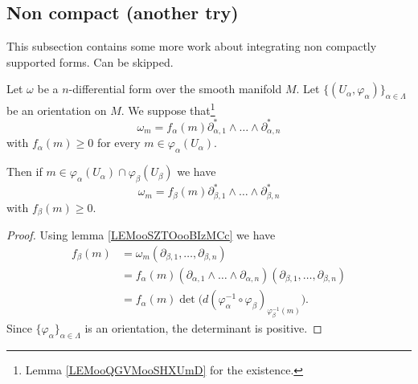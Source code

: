 

\subsection{Non compact (another try)}

This subsection contains some more work about integrating non compactly supported forms. Can be skipped.


\begin{lemma}	\label{LEMooEKYAooERjAnc}
	Let \( \omega\) be a \( n\)-differential form over the smooth manifold \( M\). Let \( \{ (U_{\alpha},\varphi_{\alpha}) \}_{\alpha\in \Lambda}\) be an orientation on \( M\). We suppose that\footnote{Lemma \ref{LEMooQGVMooSHXUmD} for the existence.}
	\begin{equation}
		\omega_m=f_{\alpha}(m)\partial_{\alpha,1}^*\wedge\ldots\wedge\partial_{\alpha,n}^*
	\end{equation}
	with \( f_{\alpha}(m)\geq 0\) for every \( m\in \varphi_{\alpha}(U_{\alpha})\).

	Then if \( m\in \varphi_{\alpha}(U_{\alpha})\cap \varphi_{\beta}(U_{\beta})\) we have
	\begin{equation}
		\omega_m=f_{\beta}(m)\partial_{\beta,1}^*\wedge\ldots\wedge\partial_{\beta,n}^*
	\end{equation}
	with \( f_{\beta}(m)\geq 0\).
\end{lemma}

\begin{proof}
	Using lemma \ref{LEMooSZTOooBIzMCc} we have
	\begin{subequations}
		\begin{align}
			f_{\beta}(m) & =\omega_m(\partial_{\beta,1},\ldots,\partial_{\beta,n})                                                                \\
			             & =f_{\alpha}(m)(\partial_{\alpha,1}\wedge\ldots\wedge\partial_{\alpha,n})(\partial_{\beta,1},\ldots,\partial_{\beta,n}) \\
			             & =f_{\alpha}(m)\det\big( d(\varphi_{\alpha}^{-1}\circ\varphi_{\beta})_{\varphi_{\beta}^{-1}(m)} \big).
		\end{align}
	\end{subequations}
	Since \( \{ \varphi_{\alpha} \}_{\alpha\in \Lambda}\) is an orientation, the determinant is positive.
\end{proof}


